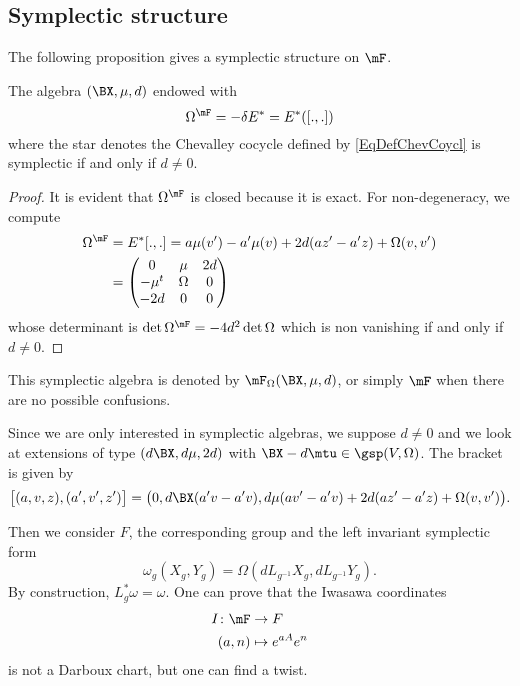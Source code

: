 \subsection{Symplectic structure}

The following proposition gives a symplectic structure on $\mF$.

\begin{proposition}
	The algebra $(\BX,\mu,d)$ endowed with
	\begin{equation}
		\Omega^{\mF}=-\delta E^*=E^*([.,.])
	\end{equation}
	where the star denotes the Chevalley cocycle defined by \eqref{EqDefChevCoycl} is symplectic if and only if $d\neq 0$.
	\label{PropSymplestarEG}
\end{proposition}

\begin{proof}
	It is evident that $\Omega^{\mF}$ is closed because it is exact. For non-degeneracy, we compute
	\[
		\begin{split}
			\Omega^{\mF}&=E^*[.,.]=a\mu(v')-a'\mu(v)+2d(az'-a'z)+\Omega(v,v')\\
			&=\begin{pmatrix}
				0        & \mu    & 2d \\
				-\mu^{t} & \Omega & 0  \\
				-2d      & 0      & 0
			\end{pmatrix}
		\end{split}
	\]
	whose determinant is $\det\Omega^{\mF}=-4d^{2}\det\Omega$ which is non vanishing if and only if $d\neq 0$.

\end{proof}

This symplectic algebra  is denoted by $\mF_{\Omega}(\BX ,\mu,d)$, or simply $\mF$ when there are no possible confusions.

Since we are only interested in symplectic algebras, we suppose $d\neq 0$ and we look at extensions of type $(d\BX ,d\mu,2d)$ with $\BX -d\mtu\in\gsp(V,\Omega)$. The bracket is given by
\begin{equation}   \label{EqCommGeneF}
	\big[ (a,v,z),(a',v',z') \big]=\big( 0,d\BX (a'v-a'v),d\mu(av'-a'v)+2d(az'-a'z)+\Omega(v,v') \big).
\end{equation}

Then we consider $F$, the corresponding group and the left invariant symplectic form
\[
	\omega_{g}(X_{g},Y_{g})=\Omega(dL_{g^{-1}}X_{g},dL_{g^{-1}}Y_{g}).
\]
By construction, $L_{g}^*\omega=\omega$. One can prove that the Iwasawa coordinates
\begin{equation}
	\begin{aligned}
		I\colon \mF & \to F                 \\
		(a,n)       & \mapsto  e^{aA} e^{n}
	\end{aligned}
\end{equation}
is not a Darboux chart, but one can find a twist.

